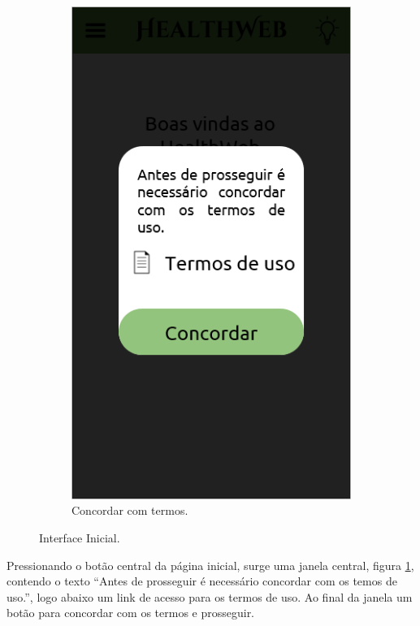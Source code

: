 \begin{figure}[htbp]
\begin{subfigure}{0.24\linewidth}
		\includegraphics[width=\linewidth]{figure/prototype/mobile/agreeing.png}
		\caption{Concordar com termos.}
		\label{fig:mobile:agreeing}
	\end{subfigure}
	\hfill
	\hspace{0.24\linewidth}
	\label{fig:mobile:home_agreeing}
	\caption{Interface Inicial.}
\end{figure}

Pressionando o botão central da página inicial, surge uma janela central, figura \ref{fig:mobile:agreeing}, contendo o texto ``Antes de prosseguir é necessário concordar com os temos de uso.'', logo abaixo um link de acesso para os termos de uso. Ao final da janela um botão para concordar com os termos e prosseguir.

